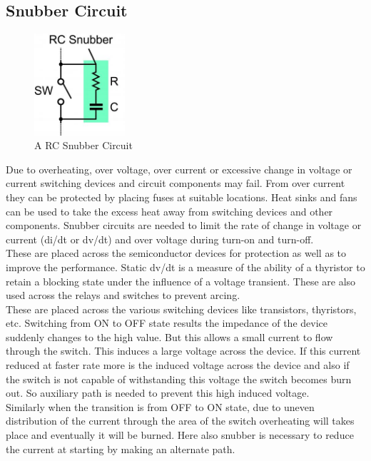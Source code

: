 \subsection{Snubber Circuit}
\begin{figure}
	\includegraphics[width=0.3\textwidth]{photos/theory/snubber.jpg}
	\caption{A RC Snubber Circuit}
\end{figure}
Due to overheating, over voltage, over current or excessive change in voltage or current switching devices and circuit components may fail. From over current they can be protected by placing fuses at suitable locations. Heat sinks and fans can be used to take the excess heat away from switching devices and other components. Snubber circuits are needed to limit the rate of change in voltage or current (di/dt or dv/dt) and over voltage during turn-on and turn-off. \\

These are placed across the semiconductor devices for protection as well as to improve the performance. Static dv/dt is a measure of the ability of a thyristor to retain a blocking state under the influence of a voltage transient. These are also used across the relays and switches to prevent arcing.\\

These are placed across the various switching devices like transistors, thyristors, etc. Switching from ON to OFF state results the impedance of the device suddenly changes to the high value. But this allows a small current to flow through the switch. This induces a large voltage across the device. If this current reduced at faster rate more is the induced voltage across the device and also if the switch is not capable of withstanding this voltage the switch becomes burn out. So auxiliary path is needed to prevent this high induced voltage. \\

Similarly when the transition is from OFF to ON state, due to uneven distribution of the current through the area of the switch overheating will takes place and eventually it will be burned. Here also snubber is necessary to reduce the current at starting by making an alternate path.\\

